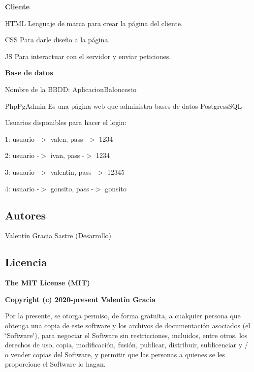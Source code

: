 {\bfseries Cliente}
\begin{DoxyItemize}
\item H\+T\+ML Lenguaje de marca para crear la página del cliente.
\item C\+SS Para darle diseño a la página.
\item JS Para interactuar con el servidor y enviar peticiones.
\end{DoxyItemize}

{\bfseries Base de datos}
\begin{DoxyItemize}
\item Nombre de la B\+B\+DD\+: Aplicacion\+Baloncesto
\item Php\+Pg\+Admin Es una página web que administra bases de datos Postgress\+S\+QL
\item Usuarios disponibles para hacer el login\+:
\item 1\+: usuario -\/$>$ valen, pass -\/$>$ 1234
\item 2\+: usuario -\/$>$ ivan, pass -\/$>$ 1234
\item 3\+: usuario -\/$>$ valentin, pass -\/$>$ 12345
\item 4\+: usuario -\/$>$ gonsito, pass -\/$>$ gonsito
\end{DoxyItemize}

\subsection*{Autores}


\begin{DoxyItemize}
\item Valentín Gracia Sastre (Desarrollo)
\end{DoxyItemize}

\subsection*{Licencia}

{\bfseries The M\+IT License (M\+IT)}

{\bfseries Copyright (c) 2020-\/present Valentín Gracia}

Por la presente, se otorga permiso, de forma gratuita, a cualquier persona que obtenga una copia de este software y los archivos de documentación asociados (el \char`\"{}\+Software\char`\"{}), para negociar el Software sin restricciones, incluidos, entre otros, los derechos de uso, copia, modificación, fusión, publicar, distribuir, sublicenciar y / o vender copias del Software, y permitir que las personas a quienes se les proporcione el Software lo hagan.

